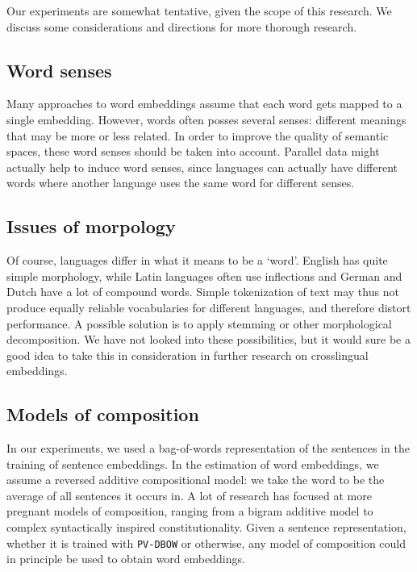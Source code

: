 
Our experiments are somewhat tentative, given the scope of this research. We discuss some considerations and directions for more thorough research.

\subsection{Word senses}
Many approaches to word embeddings assume that each word gets mapped to a single embedding. However, words often posses several senses: different meanings that may be more or less related. In order to improve the quality of semantic spaces, these word senses should be taken into account. Parallel data might actually help to induce word senses, since languages can actually have different words where another language uses the same word for different senses.

\subsection{Issues of morpology}
Of course, languages differ in what it means to be a `word'. English has quite simple morphology, while Latin languages often use inflections and German and Dutch have a lot of compound words. Simple tokenization of text may thus not produce equally reliable vocabularies for different languages, and therefore distort performance. A possible solution is to apply stemming or other morphological decomposition. We have not looked into these possibilities, but it would sure be a good idea to take this in consideration in further research on crosslingual embeddings.

\subsection{Models of composition}
In our experiments, we used a bag-of-words representation of the sentences in the training of sentence embeddings. In the estimation of word embeddings, we assume a reversed additive compositional model: we take the word to be the average of all sentences it occurs in. A lot of research has focused at more pregnant models of composition, ranging from a bigram additive model \cite{hermann2014multilingual} to complex syntactically inspired constitutionality. Given a sentence representation, whether it is trained with {\tt PV-DBOW} or otherwise, any model of composition could in principle be used to obtain word embeddings.
